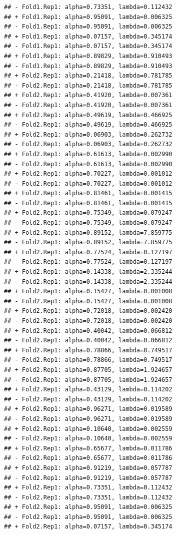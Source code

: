 \documentclass[
]{article}
\begin{document}
\begin{verbatim}
## - Fold1.Rep1: alpha=0.73351, lambda=0.112432 
## + Fold1.Rep1: alpha=0.95091, lambda=0.006325 
## - Fold1.Rep1: alpha=0.95091, lambda=0.006325 
## + Fold1.Rep1: alpha=0.07157, lambda=0.345174 
## - Fold1.Rep1: alpha=0.07157, lambda=0.345174 
## + Fold1.Rep1: alpha=0.89829, lambda=0.910493 
## - Fold1.Rep1: alpha=0.89829, lambda=0.910493 
## + Fold2.Rep1: alpha=0.21418, lambda=0.781785 
## - Fold2.Rep1: alpha=0.21418, lambda=0.781785 
## + Fold2.Rep1: alpha=0.41920, lambda=0.007361 
## - Fold2.Rep1: alpha=0.41920, lambda=0.007361 
## + Fold2.Rep1: alpha=0.49619, lambda=0.466925 
## - Fold2.Rep1: alpha=0.49619, lambda=0.466925 
## + Fold2.Rep1: alpha=0.06903, lambda=0.262732 
## - Fold2.Rep1: alpha=0.06903, lambda=0.262732 
## + Fold2.Rep1: alpha=0.61613, lambda=0.002990 
## - Fold2.Rep1: alpha=0.61613, lambda=0.002990 
## + Fold2.Rep1: alpha=0.70227, lambda=0.001012 
## - Fold2.Rep1: alpha=0.70227, lambda=0.001012 
## + Fold2.Rep1: alpha=0.81461, lambda=0.001415 
## - Fold2.Rep1: alpha=0.81461, lambda=0.001415 
## + Fold2.Rep1: alpha=0.75349, lambda=0.079247 
## - Fold2.Rep1: alpha=0.75349, lambda=0.079247 
## + Fold2.Rep1: alpha=0.89152, lambda=7.859775 
## - Fold2.Rep1: alpha=0.89152, lambda=7.859775 
## + Fold2.Rep1: alpha=0.77524, lambda=0.127197 
## - Fold2.Rep1: alpha=0.77524, lambda=0.127197 
## + Fold2.Rep1: alpha=0.14338, lambda=2.335244 
## - Fold2.Rep1: alpha=0.14338, lambda=2.335244 
## + Fold2.Rep1: alpha=0.15427, lambda=0.001008 
## - Fold2.Rep1: alpha=0.15427, lambda=0.001008 
## + Fold2.Rep1: alpha=0.72018, lambda=0.002420 
## - Fold2.Rep1: alpha=0.72018, lambda=0.002420 
## + Fold2.Rep1: alpha=0.40042, lambda=0.066812 
## - Fold2.Rep1: alpha=0.40042, lambda=0.066812 
## + Fold2.Rep1: alpha=0.78866, lambda=0.749517 
## - Fold2.Rep1: alpha=0.78866, lambda=0.749517 
## + Fold2.Rep1: alpha=0.87705, lambda=1.924657 
## - Fold2.Rep1: alpha=0.87705, lambda=1.924657 
## + Fold2.Rep1: alpha=0.43129, lambda=0.114202 
## - Fold2.Rep1: alpha=0.43129, lambda=0.114202 
## + Fold2.Rep1: alpha=0.96271, lambda=0.019589 
## - Fold2.Rep1: alpha=0.96271, lambda=0.019589 
## + Fold2.Rep1: alpha=0.10640, lambda=0.002559 
## - Fold2.Rep1: alpha=0.10640, lambda=0.002559 
## + Fold2.Rep1: alpha=0.65677, lambda=0.011786 
## - Fold2.Rep1: alpha=0.65677, lambda=0.011786 
## + Fold2.Rep1: alpha=0.91219, lambda=0.057787 
## - Fold2.Rep1: alpha=0.91219, lambda=0.057787 
## + Fold2.Rep1: alpha=0.73351, lambda=0.112432 
## - Fold2.Rep1: alpha=0.73351, lambda=0.112432 
## + Fold2.Rep1: alpha=0.95091, lambda=0.006325 
## - Fold2.Rep1: alpha=0.95091, lambda=0.006325 
## + Fold2.Rep1: alpha=0.07157, lambda=0.345174 

\end{verbatim}
\end{document}
